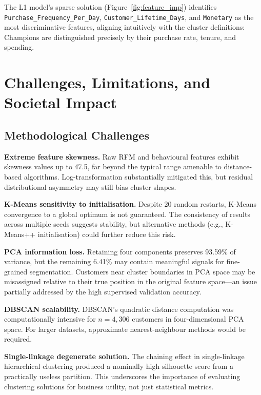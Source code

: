 \documentclass[10pt,a4paper]{article}
\begin{document}
The L1 model's sparse solution (Figure~\ref{fig:feature_imp}) identifies
\texttt{Purchase\_Frequency\_Per\_Day}, \texttt{Customer\_Lifetime\_Days}, and
\texttt{Monetary} as the most discriminative features, aligning intuitively with
the cluster definitions: Champions are distinguished precisely by their purchase
rate, tenure, and spending.

\clearpage
\section{Challenges, Limitations, and Societal Impact}

\subsection{Methodological Challenges}

\textbf{Extreme feature skewness.} Raw RFM and behavioural features exhibit skewness
values up to 47.5, far beyond the typical range amenable to distance-based algorithms.
Log-transformation substantially mitigated this, but residual distributional asymmetry
may still bias cluster shapes.

\textbf{K-Means sensitivity to initialisation.} Despite 20 random restarts, K-Means
convergence to a global optimum is not guaranteed.  The consistency of results across
multiple seeds suggests stability, but alternative methods (e.g., K-Means++ initialisation)
could further reduce this risk.

\textbf{PCA information loss.} Retaining four components preserves 93.59\% of variance,
but the remaining 6.41\% may contain meaningful signals for fine-grained segmentation.
Customers near cluster boundaries in PCA space may be misassigned relative to their
true position in the original feature space---an issue partially addressed by the
high supervised validation accuracy.

\textbf{DBSCAN scalability.} DBSCAN's quadratic distance computation was computationally
intensive for $n=4,306$ customers in four-dimensional PCA space.  For larger datasets,
approximate nearest-neighbour methods would be required.

\textbf{Single-linkage degenerate solution.} The chaining effect in single-linkage
hierarchical clustering produced a nominally high silhouette score from a practically
useless partition.  This underscores the importance of evaluating clustering solutions
for business utility, not just statistical metrics.
\end{document}
